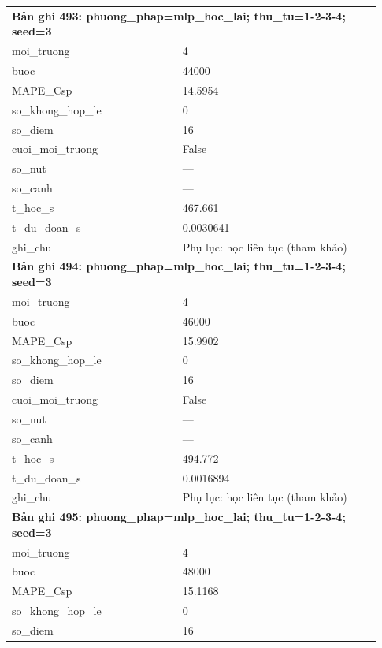 \begin{longtable}{p{0.43\linewidth}p{0.50\linewidth}}
\midrule
\multicolumn{2}{p{0.95\linewidth}}{\textbf{Bản ghi 493: phuong\_phap=mlp\_hoc\_lai; thu\_tu=1-2-3-4; seed=3}} \\
moi\_\allowbreak truong & 4 \\
buoc & 44000 \\
MAPE\_\allowbreak Csp & 14.5954 \\
so\_\allowbreak khong\_\allowbreak hop\_\allowbreak le & 0 \\
so\_\allowbreak diem & 16 \\
cuoi\_\allowbreak moi\_\allowbreak truong & False \\
so\_\allowbreak nut & — \\
so\_\allowbreak canh & — \\
t\_\allowbreak hoc\_\allowbreak s & 467.661 \\
t\_\allowbreak du\_\allowbreak doan\_\allowbreak s & 0.0030641 \\
ghi\_\allowbreak chu & Phụ lục: học liên tục (tham khảo) \\
\midrule
\multicolumn{2}{p{0.95\linewidth}}{\textbf{Bản ghi 494: phuong\_phap=mlp\_hoc\_lai; thu\_tu=1-2-3-4; seed=3}} \\
moi\_\allowbreak truong & 4 \\
buoc & 46000 \\
MAPE\_\allowbreak Csp & 15.9902 \\
so\_\allowbreak khong\_\allowbreak hop\_\allowbreak le & 0 \\
so\_\allowbreak diem & 16 \\
cuoi\_\allowbreak moi\_\allowbreak truong & False \\
so\_\allowbreak nut & — \\
so\_\allowbreak canh & — \\
t\_\allowbreak hoc\_\allowbreak s & 494.772 \\
t\_\allowbreak du\_\allowbreak doan\_\allowbreak s & 0.0016894 \\
ghi\_\allowbreak chu & Phụ lục: học liên tục (tham khảo) \\
\midrule
\multicolumn{2}{p{0.95\linewidth}}{\textbf{Bản ghi 495: phuong\_phap=mlp\_hoc\_lai; thu\_tu=1-2-3-4; seed=3}} \\
moi\_\allowbreak truong & 4 \\
buoc & 48000 \\
MAPE\_\allowbreak Csp & 15.1168 \\
so\_\allowbreak khong\_\allowbreak hop\_\allowbreak le & 0 \\
so\_\allowbreak diem & 16 \\

\end{longtable}
